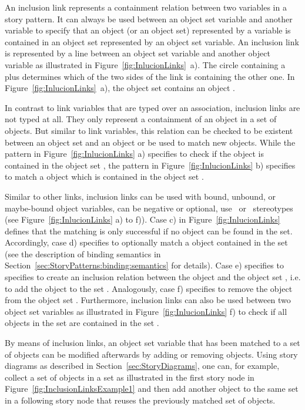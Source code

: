 An inclusion link represents a containment relation between two variables in a story pattern.
It can always be used between an object set variable and another variable to specify that
an object (or an object set) represented by a variable is contained in an object set represented by an object set variable.
An inclusion link is represented by a line between an object set variable and another object
variable as illustrated in Figure~\ref{fig:InlucionLinks}~a).
The circle containing a plus determines which of the two sides of the link is containing the other one.
In Figure~\ref{fig:InlucionLinks}~a), the object set  contains an object .

In contrast to link variables that are typed over an association, inclusion links are not typed at all.
They only represent a containment of an object in a set of objects.
But similar to link variables, this relation can be checked to be existent between an object set and an object
or be used to match new objects.
While the pattern in Figure~\ref{fig:InlucionLinks} a) specifies to check if the object  is contained in the object set ,
the pattern in Figure~\ref{fig:InlucionLinks} b) specifies to match a  object which is contained in the object set .

Similar to other links, inclusion links can be used with bound, unbound, or maybe-bound object variables, can be negative or optional, use
\create\ or \destroy\ stereotypes (see Figure~\ref{fig:InlucionLinks} a) to f)).
Case c) in Figure~\ref{fig:InlucionLinks} defines that the matching is only successful if no  object can be found in the  set.
Accordingly, case d) specifies to optionally match a  object contained in the  set
(see the description of binding semantics in Section~\ref{sec:StoryPatterns:binding:semantics} for details).
Case e) specifies to specifies to create an inclusion relation between the object  and the object set ,
i.e. to add the object  to the set .
Analogously, case f) specifies to remove the object  from the object set .
Furthermore, inclusion links can also be used between two object set variables as illustrated in Figure~\ref{fig:InlucionLinks} f)
to check if all objects in the set  are contained in the set .

By means of inclusion links, an object set variable that has been matched to a set of objects
can be modified afterwards by adding or removing objects.
Using story diagrams as described in Section~\ref{sec:StoryDiagrams},
one can, for example, collect a set of  objects in a set 
as illustrated in the first story node in Figure~\ref{fig:InclusionLinksExample1}
and then add another  object to the same set in a following story node that reuses the previously matched set of objects.

